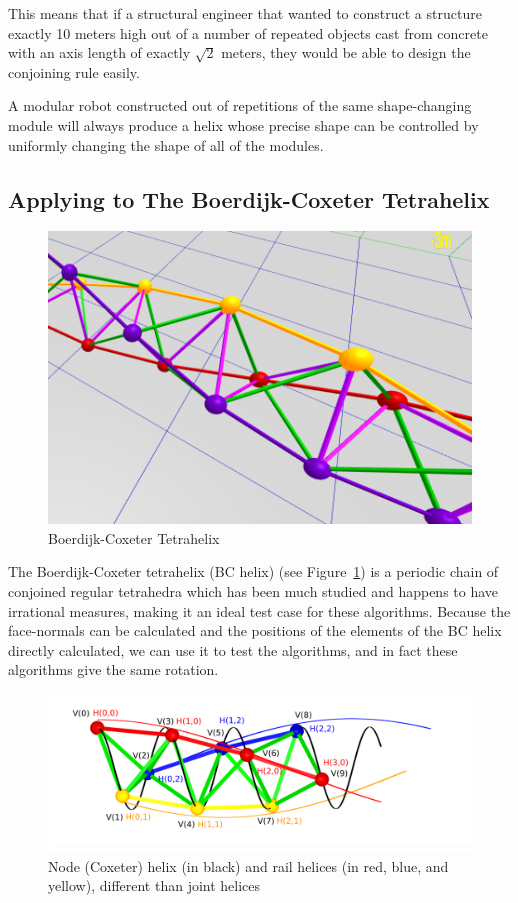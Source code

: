 \documentclass[mathematics,article,submit,pdftex,moreauthors]{Definitions/mdpi}
\begin{document}
This means that if a structural engineer that wanted to construct a structure exactly 10 meters high
out of a number of repeated objects cast from concrete with an axis length of  exactly $\sqrt{2}$ meters,
they would be able to design the conjoining rule easily.

A modular robot constructed out of repetitions of the same shape-changing module will always
produce a helix
whose precise shape can be controlled by uniformly changing the shape of all of the modules.

\subsection{Applying to The Boerdijk-Coxeter Tetrahelix}

\begin{figure}
  \centering
  \captionsetup{justification=centering}
     \includegraphics[width=10 cm]{figures/BCHelixCloseUp.png}
     \caption{Boerdijk-Coxeter Tetrahelix}
  \label{fig:bchelix}
\end{figure}
\unskip


The Boerdijk-Coxeter tetrahelix (BC helix) (see Figure~\ref{fig:bchelix}) is a periodic chain of conjoined regular tetrahedra
which has been much studied \cite{coxeter1985simplicial,sadler2019periodic,fuller1982synergetics,read2018transforming}
and happens to have irrational measures, making it an ideal
test case for these algorithms. Because the face-normals can be calculated and the
positions of the elements of the BC helix directly calculated, we can use
it to test the algorithms, and in fact these algorithms give the same rotation.


\begin{figure}
  \centering
  \captionsetup{justification=centering}
     \includegraphics[width=10 cm]{figures/UnifiedDrawing.png}
     \caption{Node (Coxeter) helix (in black) and rail helices (in red, blue, and yellow),
       different than joint helices}
  \label{fig:helixnodes}
\end{figure}
\unskip
\end{document}
